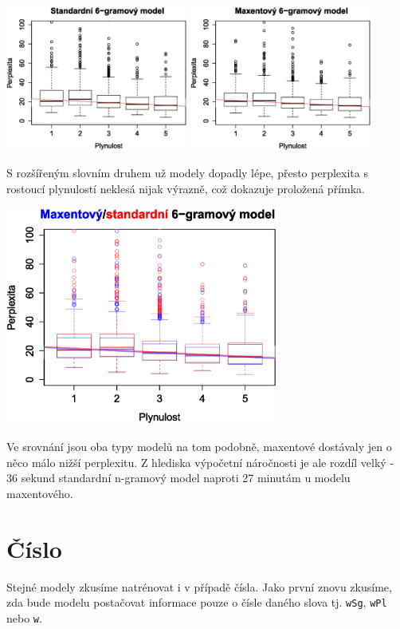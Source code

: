 \documentclass[12pt,a4paper]{report}
\begin{document}
\begin{center}
	\includegraphics[width=60mm]{./grafy/morf/ngram/rsd+rod.svg.eps}
	\includegraphics[width=60mm]{./grafy/morf/maxent/rsd+rod.svg.eps}
\end{center}
S rozšířeným slovním druhem už modely dopadly lépe, přesto perplexita s rostoucí plynulostí neklesá nijak výrazně, což dokazuje proložená přímka.
\begin{center}
	\includegraphics[width=90mm]{./grafy/morf/porovnani/rsd+rod.svg.eps}	
\end{center}
Ve srovnání jsou oba typy modelů na tom podobně, maxentové dostávaly jen o něco málo nižší perplexitu. Z hlediska výpočetní náročnosti je ale rozdíl velký - 36 sekund standardní n-gramový model naproti 27 minutám u modelu maxentového.

\section{Číslo}
Stejné modely zkusíme natrénovat i v případě čísla. Jako první znovu zkusíme, zda bude modelu postačovat informace pouze o čísle daného slova tj. \texttt{wSg}, \texttt{wPl} nebo \texttt{w}.
\end{document}
